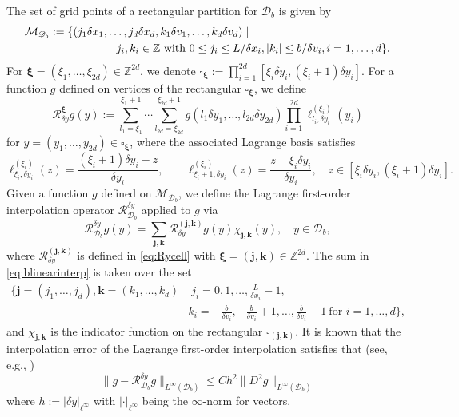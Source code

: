 \documentclass[11pt,reqno]{amsproc}
\numberwithin{equation}{section}
\begin{document}
The set of grid points of a rectangular partition for $\mathscr{D}_b$  is given by
\begin{align}\label{eq:MDb}
\mathcal M_{\mathscr D_b}&:=\{(j_1\delta x_1,\ldots, j_d\delta x_d,k_1\delta v_1,\ldots,k_d\delta v_d)\mid \\\notag
&\qquad\qquad\qquad j_i,k_i\in\mathbb{Z} \text{ with } 0\le j_{i}\le L/\delta x_i,|k_i|\le b/\delta v_i,i=1,\ldots,d\}.
\end{align} 
For $\boldsymbol\xi=(\xi_1,\ldots,\xi_{2d})\in\mathbb{Z}^{2d}$, we denote $\square_{\boldsymbol\xi}:=\prod_{i=1}^{2d}[\xi_i\delta y_i,(\xi_i+1)\delta y_i]$. For a function $g$ defined on vertices of the rectangular $\square_{\boldsymbol{\xi}}$,
we define
\begin{equation}\label{eq:Rycell}
\mathscr{R}_{\delta y}^{\boldsymbol\xi}g(y):=\sum_{l_1=\xi_1}^{\xi_1+1}\cdots\sum_{l_{2d}=\xi_{2d}}^{\xi_{2d}+1}g(l_1\delta y_1,\ldots,l_{2d}\delta y_{2d})\prod_{i=1}^{2d}\ell^{(\xi_i)}_{l_i,\delta y_i}(y_i)
\end{equation}
for $y=(y_1,\ldots,y_{2d})\in \square_{\boldsymbol\xi}$, where 
 the associated Lagrange basis satisfies 
$$\ell^{(\xi_i)}_{\xi_i,\delta y_i}(z)=\frac{(\xi_i+1)\delta y_i-z}{\delta y_i},\qquad \ell^{(\xi_i)}_{\xi_i+1,\delta y_i}(z)=\frac{z-\xi_i\delta y_i}{\delta y_i},\quad z\in[\xi_i\delta y_i,(\xi_i+1)\delta y_i].$$
 Given a function $g$ defined on $\mathcal M_{\mathscr D_b}$, we define the Lagrange first-order interpolation operator $\mathscr{R}_{\mathscr{D}_b}^{\delta y}$ applied to $g$ via
\begin{equation}\label{eq:blinearinterp}
\mathscr{R}_{\mathscr{D}_b}^{\delta y} g(y)=\sum_{\mathbf{j},\mathbf{k}}\mathscr{R}_{\delta y}^{(\mathbf{j},\mathbf{k})}g(y) \chi_{\mathbf{j},\mathbf{k}}(y),\quad y\in\mathscr{D}_b,
\end{equation}
where $\mathscr{R}_{\delta y}^{(\mathbf{j},\mathbf{k})}$ is defined in \eqref{eq:Rycell} with $\boldsymbol\xi=(\mathbf{j},\mathbf{k})\in\mathbb{Z}^{2d}$. 
The sum in \eqref{eq:blinearinterp} is taken over the set 
\begin{align*}
\Big\{\mathbf{j}=(j_1,\ldots,j_d),\mathbf{k}=(k_1,\ldots,k_d)&\mid j_i=0,1,\ldots,\frac{L}{\delta x_i}-1,\\
&k_{i}=-\frac{b}{\delta v_i},-\frac{b}{\delta v_i}+1,\ldots,\frac{b}{\delta v_i}-1~\text{for~}i=1,\ldots,d \Big\},
\end{align*}
and $\chi_{\mathbf{j},\mathbf{k}}$ is the indicator function on the rectangular $
\square_{(\mathbf{j},\mathbf{k})}$. It is known that the interpolation error of the Lagrange first-order interpolation satisfies that
 (see, e.g., \cite[Theorem 16.1]{CP91})
\begin{equation}\label{eq:Inerror}\|g-\mathscr{R}_{\mathscr{D}_b}^{\delta y} g\|_{L^\infty(\mathscr{D}_b)}\le Ch^2\|D^2g\|_{L^\infty(\mathscr{D}_b)}
\end{equation}
where $h:=|\delta y|_{\ell^\infty}$ with $|\cdot|_{\ell^\infty}$ being the $\infty$-norm for vectors.
\end{document}
